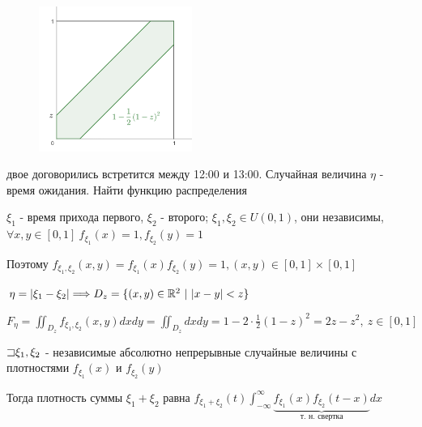 \documentclass[12pt]{article}
\begin{document}
    \begin{minipage}{\textwidth}
        \begin{figure}
            \includegraphics[width=5cm]{probtheory/images/probtheory_2024_11_26_1}
        \end{figure}

         двое договорились встретится между 12:00 и 13:00. Случайная величина $\eta$ - 
        время ожидания. Найти функцию распределения

        $\xi_1$ - время прихода первого, $\xi_2$ - второго; $\xi_1, \xi_2 \in U(0, 1)$, они независимы, 
        $\forall x, y \in [0, 1] \ f_{\xi_1}(x) = 1, f_{\xi_2}(y) = 1$

        Поэтому $f_{\xi_1, \xi_2}(x, y) = f_{\xi_1}(x) f_{\xi_2}(y) = 1, (x, y) \in [0, 1] \times [0, 1]$

        $\eta = |\xi_1 - \xi_2| \Longrightarrow D_z = \{(x, y) \in \mathbb{R}^2 \ | \ |x - y| < z\}$

        $F_\eta = \iint_{D_z} f_{\xi_1, \xi_2}(x, y) dxdy = \iint_{D_z} dxdy = 1 - 2 \cdot \frac{1}{2} (1 - z)^2 = 
        2z - z^2, \ z \in [0, 1]$
    \end{minipage}

    \begin{MyTheorem}
        \Ths $\mathord{\sqsupset} \xi_1, \xi_2$ - независимые абсолютно непрерывные случайные величины с плотностями
        $f_{\xi_1}(x)$ и $f_{\xi_2}(y)$

        Тогда плотность суммы $\xi_1 + \xi_2$ равна $f_{\xi_1 + \xi_2}(t) \int_{-\infty}^\infty 
        \underset{\text{т. н. свертка}}{\underbrace{f_{\xi_1}(x) f_{\xi_2}(t - x)}} dx$
    \end{MyTheorem}
\end{document}
